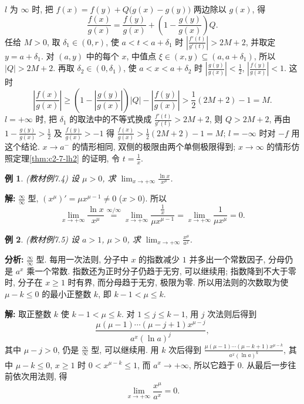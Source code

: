 \documentclass[UTF8,openany]{ctexbook}
\theoremstyle{chinesetextbook}
\newtheorem{example}{例}[section]
\newenvironment{cnsolution}{\par\indent\textbf{解:} \ignorespaces}{\par}
\begin{document}
$l$ 为 $\infty$ 时, 把 $f(x)=f(y)+Q\bigl(g(x)-g(y)\bigr)$ 两边除以 $g(x)$, 得
\[
\frac{f(x)}{g(x)}=\frac{f(y)}{g(x)}+\left(1-\frac{g(y)}{g(x)}\right)Q.
\]
任给 $M>0$, 取 $\delta_1\in(0,r)$, 使 $a<t<a+\delta_1$ 时 $\displaystyle\left|\frac{f'(t)}{g'(t)}\right|>2M+2$, 并取定 $y=a+\delta_1$. 对 $(a,y)$ 中的每个 $x$, 中值点 $\xi\in(x,y)\subseteq(a,a+\delta_1)$, 所以 $|Q|>2M+2$. 再取 $\delta_2\in(0,\delta_1)$, 使 $a<x<a+\delta_2$ 时 $\displaystyle\left|\frac{g(y)}{g(x)}\right|<\frac12$, $\displaystyle\left|\frac{f(y)}{g(x)}\right|<1$. 这时
\[
\left|\frac{f(x)}{g(x)}\right|\ge\left(1-\left|\frac{g(y)}{g(x)}\right|\right)|Q|-\left|\frac{f(y)}{g(x)}\right|>\frac12(2M+2)-1=M.
\]
$l=+\infty$ 时, 把 $\delta_1$ 的取法中的不等式换成 $\displaystyle\frac{f'(t)}{g'(t)}>2M+2$, 则 $Q>2M+2$, 再由 $\displaystyle1-\frac{g(y)}{g(x)}>\frac12$ 及 $\displaystyle\frac{f(y)}{g(x)}>-1$ 得 $\displaystyle\frac{f(x)}{g(x)}>\frac12(2M+2)-1=M$; $l=-\infty$ 时对 $-f$ 用这个结论. $x\to a^-$ 的情形相同, 双侧的极限由两个单侧极限得到; $x\to\infty$ 的情形仿照定理\ref{thm:c2-7-lh2} 的证明, 令 $\displaystyle t=\frac1x$.
\begin{example}\label{ex:c2-7-4}
\textnormal{(教材例7.4)} 设 $\mu>0$, 求 $\displaystyle\lim_{x\to+\infty}\frac{\ln x}{x^\mu}$.
\end{example}
\begin{cnsolution}
$\displaystyle\frac\infty\infty$ 型, $(x^\mu)'=\mu x^{\mu-1}\ne0$ ($x>0$). 所以
\[
\lim_{x\to+\infty}\frac{\ln x}{x^\mu}\overset{\infty/\infty}{=}\lim_{x\to+\infty}\frac{\frac1x}{\mu x^{\mu-1}}=\lim_{x\to+\infty}\frac1{\mu x^\mu}=0.
\]
\end{cnsolution}
\begin{example}\label{ex:c2-7-5}
\textnormal{(教材例7.5)} 设 $a>1$, $\mu>0$, 求 $\displaystyle\lim_{x\to+\infty}\frac{x^\mu}{a^x}$.
\end{example}
\par\indent\textbf{分析:} $\displaystyle\frac\infty\infty$ 型. 每用一次法则, 分子中 $x$ 的指数减少 $1$ 并多出一个常数因子, 分母仍是 $a^x$ 乘一个常数. 指数还为正时分子仍趋于无穷, 可以继续用; 指数降到不大于零时, 分子在 $x\ge1$ 时有界, 而分母趋于无穷, 极限为零. 所以用法则的次数取为使 $\mu-k\le0$ 的最小正整数 $k$, 即 $k-1<\mu\le k$.
\begin{cnsolution}
取正整数 $k$ 使 $k-1<\mu\le k$. 对 $1\le j\le k-1$, 用 $j$ 次法则后得到
\[
\frac{\mu(\mu-1)\cdots(\mu-j+1)x^{\mu-j}}{a^x(\ln a)^j},
\]
其中 $\mu-j>0$, 仍是 $\displaystyle\frac\infty\infty$ 型, 可以继续用. 用 $k$ 次后得到 $\displaystyle\frac{\mu(\mu-1)\cdots(\mu-k+1)x^{\mu-k}}{a^x(\ln a)^k}$, 其中 $\mu-k\le0$, $x\ge1$ 时 $0<x^{\mu-k}\le1$, 而 $a^x\to+\infty$, 所以它趋于 $0$. 从最后一步往前依次用法则, 得
\[
\lim_{x\to+\infty}\frac{x^\mu}{a^x}=0.
\]
\end{cnsolution}
\end{document}
